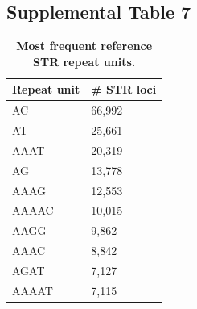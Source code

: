 \pagebreak

\subsection{Supplemental Table 7}
\begin{table}[h!]
\centering
\label{tab:lobsuptab7}
\begin{tabular}{l l}
\hline
Repeat unit & \# STR loci \\
\hline
AC	& 66,992\\
AT	& 25,661\\
AAAT &	20,319\\
AG	& 13,778\\
AAAG	& 12,553\\
AAAAC &	10,015 \\
AAGG	 & 9,862\\
AAAC	& 8,842\\
AGAT	& 7,127\\
AAAAT	& 7,115\\

\hline
\end{tabular}
\caption{\textbf{Most frequent reference STR repeat units.}}
\end{table}



